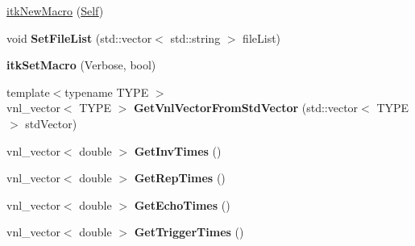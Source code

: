 \begin{DoxyCompactItemize}
\item 
\hyperlink{classitk_1_1_read_file_list_filter_a831a587afdb1c1ad738328be5293ff58}{itk\-New\-Macro} (\hyperlink{classitk_1_1_read_file_list_filter_a673994032806285b12a3de9b7d536fbd}{Self})
\item 
\hypertarget{classitk_1_1_read_file_list_filter_afebfb0cbae3e070f4c334a9f3d54936c}{void {\bfseries Set\-File\-List} (std\-::vector$<$ std\-::string $>$ file\-List)}\label{classitk_1_1_read_file_list_filter_afebfb0cbae3e070f4c334a9f3d54936c}

\item 
\hypertarget{classitk_1_1_read_file_list_filter_a75286c45a7465f694ee024bb984e1bee}{{\bfseries itk\-Set\-Macro} (Verbose, bool)}\label{classitk_1_1_read_file_list_filter_a75286c45a7465f694ee024bb984e1bee}

\item 
\hypertarget{classitk_1_1_read_file_list_filter_a8aaa836210f32ba2078ba68354a9b277}{{\footnotesize template$<$typename T\-Y\-P\-E $>$ }\\vnl\-\_\-vector$<$ T\-Y\-P\-E $>$ {\bfseries Get\-Vnl\-Vector\-From\-Std\-Vector} (std\-::vector$<$ T\-Y\-P\-E $>$ std\-Vector)}\label{classitk_1_1_read_file_list_filter_a8aaa836210f32ba2078ba68354a9b277}

\item 
\hypertarget{classitk_1_1_read_file_list_filter_ac7d93e314f3653009f8ebe52c30fec3f}{vnl\-\_\-vector$<$ double $>$ {\bfseries Get\-Inv\-Times} ()}\label{classitk_1_1_read_file_list_filter_ac7d93e314f3653009f8ebe52c30fec3f}

\item 
\hypertarget{classitk_1_1_read_file_list_filter_a45d12748714cc0d4bd0167098b326061}{vnl\-\_\-vector$<$ double $>$ {\bfseries Get\-Rep\-Times} ()}\label{classitk_1_1_read_file_list_filter_a45d12748714cc0d4bd0167098b326061}

\item 
\hypertarget{classitk_1_1_read_file_list_filter_ab73b79779c9ceeca0943475ea5a3d837}{vnl\-\_\-vector$<$ double $>$ {\bfseries Get\-Echo\-Times} ()}\label{classitk_1_1_read_file_list_filter_ab73b79779c9ceeca0943475ea5a3d837}

\item 
\hypertarget{classitk_1_1_read_file_list_filter_aea57c075a4f145d56fc512e1c4d3567e}{vnl\-\_\-vector$<$ double $>$ {\bfseries Get\-Trigger\-Times} ()}\label{classitk_1_1_read_file_list_filter_aea57c075a4f145d56fc512e1c4d3567e}


\end{DoxyCompactItemize}
